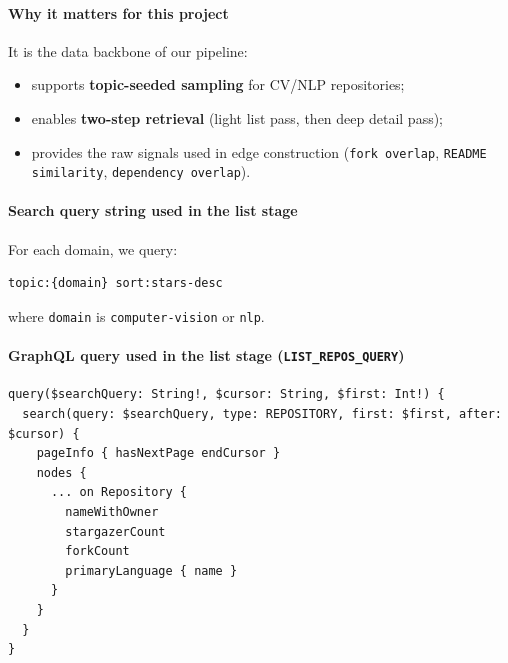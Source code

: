\documentclass[11pt]{article}
\begin{document}
\paragraph{Why it matters for this project}
It is the data backbone of our pipeline:
\begin{itemize}[leftmargin=1.5em]
    \item supports \textbf{topic-seeded sampling} for CV/NLP repositories;
    \item enables \textbf{two-step retrieval} (light list pass, then deep detail pass);
    \item provides the raw signals used in edge construction (\texttt{fork overlap}, \texttt{README similarity}, \texttt{dependency overlap}).
\end{itemize}

\paragraph{Search query string used in the list stage}
For each domain, we query:
\begin{verbatim}
topic:{domain} sort:stars-desc
\end{verbatim}
where \texttt{domain} is \texttt{computer-vision} or \texttt{nlp}.

\paragraph{GraphQL query used in the list stage (\texttt{LIST\_REPOS\_QUERY})}
\begin{verbatim}
query($searchQuery: String!, $cursor: String, $first: Int!) {
  search(query: $searchQuery, type: REPOSITORY, first: $first, after: $cursor) {
    pageInfo { hasNextPage endCursor }
    nodes {
      ... on Repository {
        nameWithOwner
        stargazerCount
        forkCount
        primaryLanguage { name }
      }
    }
  }
}
\end{verbatim}
\end{document}
